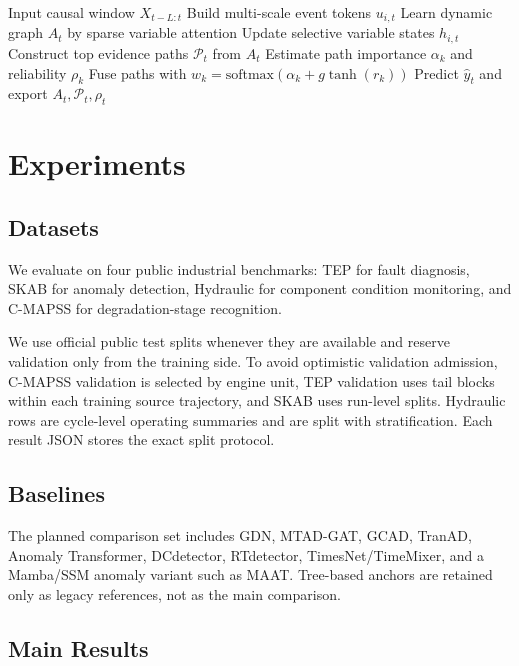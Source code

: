 \documentclass[letterpaper]{article}
\begin{document}
\begin{algorithm}[t]
\caption{MS-GSE + RPF}
\begin{algorithmic}[1]
\STATE Input causal window \(X_{t-L:t}\)
\STATE Build multi-scale event tokens \(u_{i,t}\)
\STATE Learn dynamic graph \(A_t\) by sparse variable attention
\STATE Update selective variable states \(h_{i,t}\)
\STATE Construct top evidence paths \(\mathcal{P}_t\) from \(A_t\)
\STATE Estimate path importance \(\alpha_k\) and reliability \(\rho_k\)
\STATE Fuse paths with \(w_k = \text{softmax}(\alpha_k + g\tanh(r_k))\)
\STATE Predict \(\hat y_t\) and export \(A_t,\mathcal{P}_t,\rho_t\)
\end{algorithmic}
\end{algorithm}

\section{Experiments}

\subsection{Datasets}

We evaluate on four public industrial benchmarks: TEP for fault diagnosis, SKAB for anomaly detection, Hydraulic for component condition monitoring, and C-MAPSS for degradation-stage recognition.

We use official public test splits whenever they are available and reserve validation only from the training side. To avoid optimistic validation admission, C-MAPSS validation is selected by engine unit, TEP validation uses tail blocks within each training source trajectory, and SKAB uses run-level splits. Hydraulic rows are cycle-level operating summaries and are split with stratification. Each result JSON stores the exact split protocol.

\subsection{Baselines}

The planned comparison set includes GDN, MTAD-GAT, GCAD, TranAD, Anomaly Transformer, DCdetector, RTdetector, TimesNet/TimeMixer, and a Mamba/SSM anomaly variant such as MAAT. Tree-based anchors are retained only as legacy references, not as the main comparison.

\subsection{Main Results}
\end{document}
